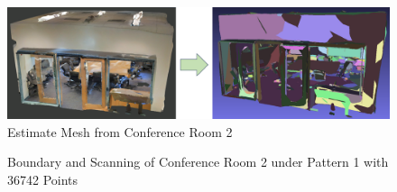 \documentclass[11pt, a4paper,oneside,chapterprefix=false]{scrbook}
\begin{document}
\vspace{10pt}

\begin{figure}[H]
    \centering
    \includegraphics*[width=1.0\textwidth]{figures/estimate conf2.png}
    \caption{Estimate Mesh from Conference Room 2}
    \label{fig:estimate mesh from conference room 2}
\end{figure}

\begin{figure}[H]
    \centering
      \label{fig:conf2 b 0} \hfill
     \label{fig:conf2 s 0}
    \caption{Boundary and Scanning of Conference Room 2 under Pattern 1 with 36742 Points}
    \label{fig:conf2 0}
\end{figure}
\end{document}
